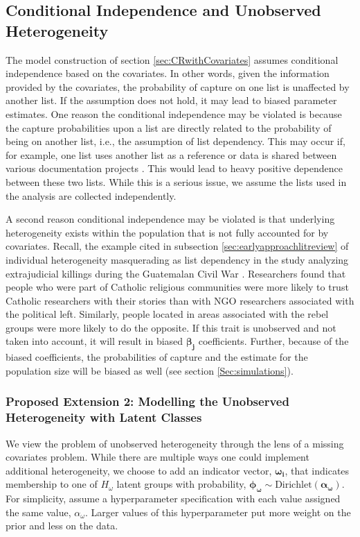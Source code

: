 \documentclass[
  12pt,
]{article}
\begin{document}
\subsection{Conditional Independence and Unobserved Heterogeneity}
\label{Sec:condindependence}

The model construction of section \ref{sec:CRwithCovariates} assumes
conditional independence based on the covariates. In other words, given
the information provided by the covariates, the probability of capture
on one list is unaffected by another list. If the assumption does not
hold, it may lead to biased parameter estimates. One reason the
conditional independence may be violated is because the capture
probabilities upon a list are directly related to the probability of
being on another list, i.e., the assumption of list dependency. This may
occur if, for example, one list uses another list as a reference or data
is shared between various documentation projects
\citep{manrique-vallier_capture-recapture_2020}. This would lead to
heavy positive dependence between these two lists. While this is a
serious issue, we assume the lists used in the analysis are collected
independently.

A second reason conditional independence may be violated is that
underlying heterogeneity exists within the population that is not fully
accounted for by covariates. Recall, the example cited in subsection
\ref{sec:earlyapproachlitreview} of individual heterogeneity
masquerading as list dependency in the study analyzing extrajudicial
killings during the Guatemalan Civil War \citep{ball_making_2000}.
Researchers found that people who were part of Catholic religious
communities were more likely to trust Catholic researchers with their
stories than with NGO researchers associated with the political left.
Similarly, people located in areas associated with the rebel groups were
more likely to do the opposite. If this trait is unobserved and not
taken into account, it will result in biased \(\boldsymbol{\beta_j}\)
coefficients. Further, because of the biased coefficients, the
probabilities of capture and the estimate for the population size will
be biased as well (see section \ref{Sec:simulations}).

\subsubsection{Proposed Extension 2: Modelling the Unobserved Heterogeneity with Latent Classes}

We view the problem of unobserved heterogeneity through the lens of a
missing covariates problem. While there are multiple ways one could
implement additional heterogeneity, we choose to add an indicator
vector, \(\boldsymbol{\omega_i}\), that indicates membership to one of
\(H_\omega\) latent groups with probability,
\(\boldsymbol{\phi_\omega}\sim \text{Dirichlet}(\boldsymbol{\alpha_\omega})\).
For simplicity, assume a hyperparameter specification with each value
assigned the same value, \(\alpha_\omega\). Larger values of this
hyperparameter put more weight on the prior and less on the data.
\end{document}

